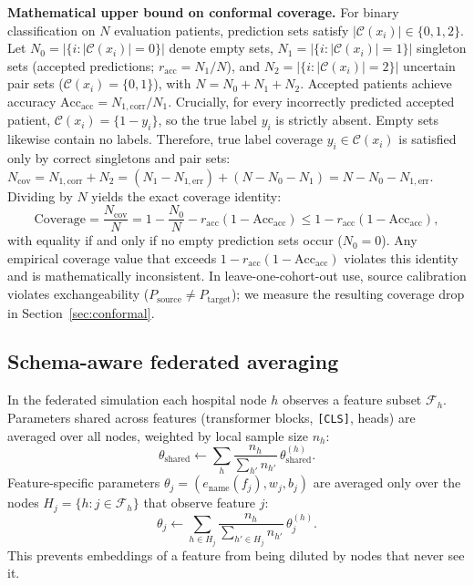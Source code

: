 \documentclass[journal]{IEEEtran}
\begin{document}
\textbf{Mathematical upper bound on conformal coverage.} For binary classification on $N$ evaluation patients, prediction sets satisfy $|\mathcal{C}(x_i)|\in\{0,1,2\}$. Let $N_0 = |\{i : |\mathcal{C}(x_i)|=0\}|$ denote empty sets, $N_1 = |\{i : |\mathcal{C}(x_i)|=1\}|$ singleton sets (accepted predictions; $r_{\mathrm{acc}}=N_1/N$), and $N_2 = |\{i : |\mathcal{C}(x_i)|=2\}|$ uncertain pair sets ($\mathcal{C}(x_i)=\{0,1\}$), with $N=N_0+N_1+N_2$. Accepted patients achieve accuracy $\mathrm{Acc}_{\mathrm{acc}} = N_{1,\mathrm{corr}}/N_1$. Crucially, for every incorrectly predicted accepted patient, $\mathcal{C}(x_i)=\{1-y_i\}$, so the true label $y_i$ is strictly absent. Empty sets likewise contain no labels. Therefore, true label coverage $y_i\in\mathcal{C}(x_i)$ is satisfied only by correct singletons and pair sets: $N_{\mathrm{cov}} = N_{1,\mathrm{corr}} + N_2 = (N_1 - N_{1,\mathrm{err}}) + (N - N_0 - N_1) = N - N_0 - N_{1,\mathrm{err}}$. Dividing by $N$ yields the exact coverage identity:
\begin{equation}
\mathrm{Coverage} = \frac{N_{\mathrm{cov}}}{N} = 1 - \frac{N_0}{N} - r_{\mathrm{acc}}(1 - \mathrm{Acc}_{\mathrm{acc}}) \le 1 - r_{\mathrm{acc}}(1 - \mathrm{Acc}_{\mathrm{acc}}),
\label{eq:conformal_bound}
\end{equation}
with equality if and only if no empty prediction sets occur ($N_0=0$). Any empirical coverage value that exceeds $1 - r_{\mathrm{acc}}(1 - \mathrm{Acc}_{\mathrm{acc}})$ violates this identity and is mathematically inconsistent. In leave-one-cohort-out use, source calibration violates exchangeability ($P_{\mathrm{source}}\neq P_{\mathrm{target}}$); we measure the resulting coverage drop in Section~\ref{sec:conformal}.

\subsection{Schema-aware federated averaging}
In the federated simulation each hospital node $h$ observes a feature subset $\mathcal{F}_h$. Parameters shared across features (transformer blocks, \texttt{[CLS]}, heads) are averaged over all nodes, weighted by local sample size $n_h$:
\begin{equation}
\theta_{\mathrm{shared}}\leftarrow\sum_h \frac{n_h}{\sum_{h'}n_{h'}}\,\theta^{(h)}_{\mathrm{shared}}.
\end{equation}
Feature-specific parameters $\theta_j=(e_{\mathrm{name}}(f_j),w_j,b_j)$ are averaged only over the nodes $H_j=\{h: j\in\mathcal{F}_h\}$ that observe feature $j$:
\begin{equation}
\theta_j\leftarrow\sum_{h\in H_j}\frac{n_h}{\sum_{h'\in H_j}n_{h'}}\,\theta^{(h)}_j.
\end{equation}
This prevents embeddings of a feature from being diluted by nodes that never see it.
\end{document}
